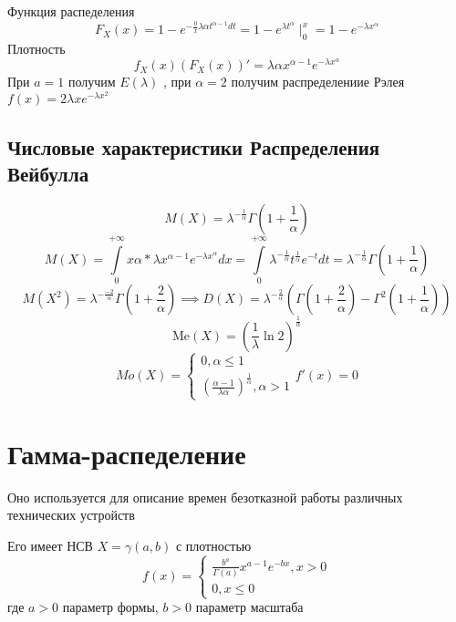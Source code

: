 \documentclass[14pt]{extarticle}
\begin{document}
 Функция распеделения
 \begin{equation}
 	F_{X}(x) = 1 - e^{- \frac{0}{x} \lambda \alpha t^{\alpha - 1} dt} = 1- e^{\lambda t^{\alpha}} \mid_{0}^{x} = 1 - e^{-\lambda x^{\alpha}}
 \end{equation}
 Плотность
 \begin{equation}
 	f_{X}(x) (F_{X}(x))' = \lambda \alpha x^{\alpha - 1} e^{-\lambda x^{\alpha}}
 \end{equation}
 При $a = 1$ получим  $E(\lambda)$ , при  $\alpha = 2$ получим распределениие Рэлея  $f(x) = 2\lambda x e^{-\lambda x^2}$
 \subsection{Числовые характеристики Распределения Вейбулла}
 \begin{equation}
 	M(X) = \lambda^{-\frac{1}{\alpha}} \Gamma(1+  \frac{1}{\alpha})
 \end{equation}
 \begin{equation}
 	M(X) = \int\limits_{0}^{+\infty}  x \alpha * \lambda x^{\alpha - 1} e^{-\lambda x^{\alpha}} dx = \int\limits_{0}^{+\infty} \lambda^{-\frac{1}{\alpha}} t^{\frac{1}{\alpha}} e^{-t} dt = \lambda^{-\frac{1}{\alpha}} \Gamma(1 + \frac{1}{\alpha})
 \end{equation}
 \begin{equation}
	 M(X^2) = \lambda^{-\frac{-2}{\alpha}} \Gamma(1 + \frac{2}{\alpha}) \implies D(X) = \lambda^{-\frac{2}{\alpha}}  (
	 	\Gamma(1 + \frac{2}{\alpha}) - \Gamma^2(1 + \frac{1}{\alpha})
	 )
 \end{equation}
 \begin{equation}
	 \text{Me} (X) = (\frac{1}{\lambda} \ln{2}) ^{\frac{1}{\alpha}}
 \end{equation}
 \begin{equation}
 	Mo(X) = 
	\begin{cases}
		0, \alpha \le  1\\
		(\frac{\alpha - 1}{\lambda \alpha})^{\frac{1}{\alpha}}, \alpha > 1
	\end{cases}
	f'(x )  = 0
 \end{equation}
 \section{Гамма-распеделение}
 Оно используется для описание времен безотказной работы различных 
 технических устройств

 Его имеет НСВ $X = \gamma(a,b)$ с плотностью
  \begin{equation}
 	f(x) =
	\begin{cases}
		\frac{b^{a}}{\Gamma(a)} x^{a - 1} e^{-b x} ,x>0\\
		0 , x \le  0
	\end{cases}
 \end{equation}
 где $a > 0$ параметр формы,  $b > 0$ параметр масштаба
\end{document}
